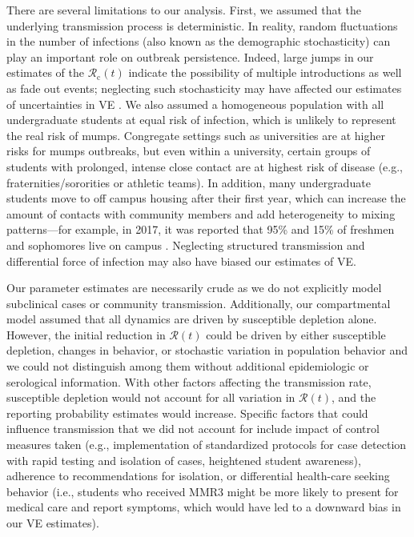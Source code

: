 \documentclass[12pt]{article}
\begin{document}
There are several limitations to our analysis. 
First, we assumed that the underlying transmission process is deterministic. 
In reality, random fluctuations in the number of infections (also known as the demographic stochasticity) can play an important role on outbreak persistence.
Indeed, large jumps in our estimates of the $\mathcal{R}_{\mathrm c}(t)$ indicate the possibility of multiple introductions as well as fade out events;
neglecting such stochasticity may have affected our estimates of uncertainties in VE \citep{king2015avoidable}.
We also assumed a homogeneous population with all undergraduate students at equal risk of infection, which is unlikely to represent the real risk of mumps. 
Congregate settings such as universities are at higher risks for mumps outbreaks, but even within a university, certain groups of students with prolonged, intense close contact are at highest risk of disease (e.g., fraternities/sororities or athletic teams). 
In addition, many undergraduate students move to off campus housing after their first year, which can increase the amount of contacts with community members and add heterogeneity to mixing patterns---for example, in 2017, it was reported that 95\% and 15\% of freshmen and sophomores live on campus \citep{news}.
Neglecting structured transmission and differential force of infection may also have biased our estimates of VE.

Our parameter estimates are necessarily crude as we do not explicitly model subclinical cases or community transmission.
Additionally, our compartmental model assumed that all dynamics are driven by susceptible depletion alone.
However, the initial reduction in $\mathcal R(t)$ could be driven by either susceptible depletion, changes in behavior, or stochastic variation in population behavior and we could not distinguish among them without additional epidemiologic or serological information.
With other factors affecting the transmission rate, susceptible depletion would not account for all variation in $\mathcal R(t)$, and the reporting probability estimates would increase.
Specific factors that could influence transmission that we did not account for include impact of control measures taken (e.g., implementation of standardized protocols for case detection with rapid testing and isolation of cases, heightened student awareness), adherence to recommendations for isolation, or differential health-care seeking behavior (i.e., students who received MMR3 might be more likely to present for medical care and report symptoms, which would have led to a downward bias in our VE estimates).
\end{document}
